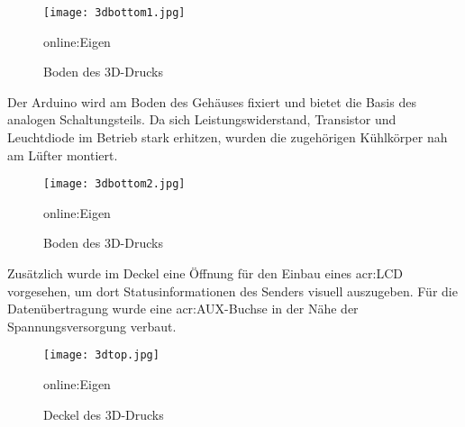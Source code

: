 \begin{figure}[H]
	\centering
	\texttt{[image: 3dbottom1.jpg]}
	\caption[Boden des 3D-Drucks]{Boden des 3D-Drucks} \gls{online:Eigen}
	\label{fig:3dbottom1}
\end{figure}

Der Arduino wird am Boden des Gehäuses fixiert und bietet die Basis des analogen Schaltungsteils.
Da sich Leistungswiderstand, Transistor und Leuchtdiode im Betrieb stark erhitzen, wurden die zugehörigen Kühlkörper nah am Lüfter montiert.

\begin{figure}[H]
	\centering
	\texttt{[image: 3dbottom2.jpg]}
	\caption[Boden des 3D-Drucks]{Boden des 3D-Drucks} \gls{online:Eigen}
	\label{fig:3dbottom2}
\end{figure}

Zusätzlich wurde im Deckel eine Öffnung für den Einbau eines \gls{acr:LCD} vorgesehen, um dort Statusinformationen des Senders visuell auszugeben. Für die Datenübertragung wurde eine \gls{acr:AUX}-Buchse in der Nähe der Spannungsversorgung verbaut.

\begin{figure}[H]
	\centering
	\texttt{[image: 3dtop.jpg]}
	\caption[Deckel des 3D-Drucks]{Deckel des 3D-Drucks} \gls{online:Eigen}
	\label{fig:3dtop}
\end{figure}






